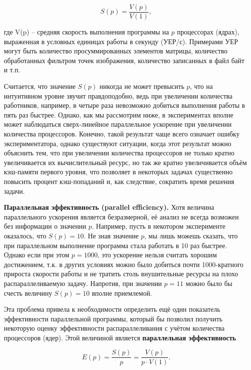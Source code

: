 \begin{equation}
    \label{parallelAcceleration:equation}
    S(p) = \frac{V(p)}{V(1)},
\end{equation}

\noindent где V(p) – средняя скорость выполнения программы на $p$ процессорах (ядрах), выраженная в условных единицах работы в секунду (УЕР/с). Примерами УЕР могут быть количество просуммированных элементов матрицы, количество обработанных фильтром точек изображения, количество записанных в файл байт и т.п.

Считается, что значение $S(p)$ никогда не может превысить $p$, что на интуитивном уровне звучит правдоподобно, ведь при увеличении количества работников, например, в четыре раза невозможно добиться выполнения работы в пять раз быстрее.  Однако, как мы рассмотрим ниже, в экспериментах вполне может наблюдаться сверх-линейное параллельное ускорение при увеличении количества процессоров. Конечно, такой результат чаще всего означает ошибку экспериментатора, однако существуют ситуации, когда этот результат можно объяснить тем, что при увеличении количества процессоров не только кратно увеличивается их вычислительный ресурс, но так же кратно увеличивается объём кэш-памяти первого уровня, что позволяет в некоторых задачах существенно повысить процент кэш-попаданий и, как следствие, сократить время решения задачи.

\textbf{Параллельная эффективность (parallel efficiency).} Хотя величина параллельного ускорения является безразмерной, её анализ не всегда возможен без информации о значении $p$. Например, пусть в некотором эксперименте оказалось, что $S(p)=10$. Не зная значение $p$, мы лишь можешь сказать, что при параллельном выполнение программа стала работать в 10 раз быстрее. Однако если при этом $p=1000$, это ускорение нельзя считать хорошим достижением, т.к. в других условиях можно было добиться почти 1000-кратного прироста скорости работы и не тратить столь внушительные ресурсы на плохо распараллеливаемую задачу. Напротив, при значении $p=11$ можно было бы счесть  величину $S(p)=10$ вполне приемлемой.

Эта проблема привела к необходимости определить ещё один показатель эффективности параллельной программы, который бы позволил получить некоторую оценку эффективности распараллеливания с учётом количества процессоров (ядер). Этой величиной является \textbf{параллельная эффективность}

\begin{equation}
    \label{parallelEffect:equation}
    E(p) = \frac{S(p)}{p} = \frac{V(p)}{p \cdot V(1)}.
\end{equation}

